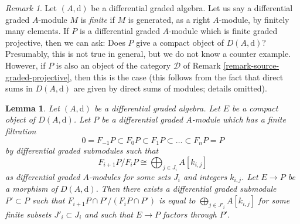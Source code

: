 \documentclass{stacks-project}
\theoremstyle{plain}
\newtheorem{lemma}[subsection]{Lemma}
\theoremstyle{definition}
\theoremstyle{remark}
\newtheorem{remark}[subsection]{Remark}
\numberwithin{equation}{subsection}
\begin{document}
\begin{remark}
\label{remark-graded-projective-is-compact}
Let $(A, \text{d})$ be a differential graded algebra. Let us say a
differential graded $A$-module $M$ is {\it finite} if $M$ is generated,
as a right $A$-module, by finitely many elements. If $P$ is a
differential graded $A$-module which is finite graded projective,
then we can ask: Does $P$ give a compact object of $D(A, \text{d})$?
Presumably, this is not true in general, but we do not know a
counter example. However, if $P$ is also an object of the category
$\mathcal{D}$ of Remark \ref{remark-source-graded-projective},
then this is the case (this follows from the fact that direct sums
in $D(A, \text{d})$ are given by direct sums of modules; details omitted).
\end{remark}

\begin{lemma}
\label{lemma-factor-through-nicer}
Let $(A, \text{d})$ be a differential graded algebra. Let $E$ be a compact
object of $D(A, \text{d})$. Let $P$ be a differential graded $A$-module
which has a finite filtration
$$
0 = F_{-1}P \subset F_0P \subset F_1P \subset \ldots \subset F_nP = P
$$
by differential graded submodules such that
$$
F_{i + 1}P/F_iP \cong \bigoplus\nolimits_{j \in J_i} A[k_{i, j}]
$$
as differential graded $A$-modules for some sets $J_i$ and integers $k_{i, j}$.
Let $E \to P$ be a morphism of $D(A, \text{d})$.
Then there exists a differential graded submodule $P' \subset P$ such that
$F_{i + 1}P \cap P'/(F_iP \cap P')$ is equal to
$\bigoplus_{j \in J'_i} A[k_{i, j}]$ for some finite subsets
$J'_i \subset J_i$ and such that $E \to P$ factors through $P'$.
\end{lemma}
\end{document}
